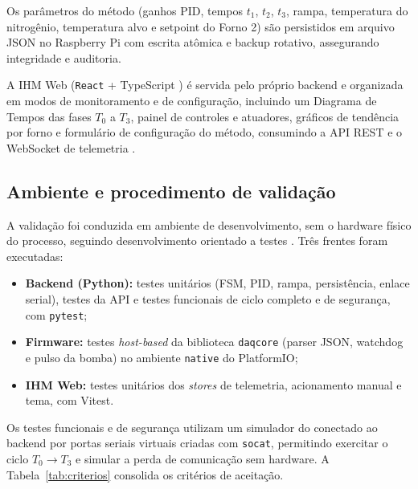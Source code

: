 Os par\^ametros do m\'etodo (ganhos PID, tempos $t_1$, $t_2$, $t_3$, rampa,
temperatura do nitrog\^enio, temperatura alvo e setpoint do Forno 2) s\~ao
persistidos em arquivo JSON no Raspberry Pi com escrita at\^omica e backup
rotativo, assegurando integridade e auditoria.

A IHM Web (\texttt{React} + TypeScript \cite{react}) \'e servida pelo pr\'oprio
backend e organizada em modos de monitoramento e de configura\c{c}\~ao,
incluindo um Diagrama de Tempos das fases $T_0$ a $T_3$, painel de controles e
atuadores, gr\'aficos de tend\^encia por forno e formul\'ario de configura\c{c}\~ao
do m\'etodo, consumindo a API REST e o WebSocket de telemetria \cite{fette2011}.

\subsection{Ambiente e procedimento de valida\c{c}\~ao}

A valida\c{c}\~ao foi conduzida em ambiente de desenvolvimento, sem o hardware
f\'isico do processo, seguindo desenvolvimento orientado a testes
\cite{beck2002}. Tr\^es frentes foram executadas:

\begin{itemize}
  \item \textbf{Backend (Python):} testes unit\'arios (FSM, PID, rampa,
  persist\^encia, enlace serial), testes da API e testes funcionais de ciclo
  completo e de seguran\c{c}a, com \texttt{pytest};
  \item \textbf{Firmware:} testes \emph{host-based} da biblioteca \texttt{daqcore}
  (parser JSON, watchdog e pulso da bomba) no ambiente \texttt{native} do
  PlatformIO;
  \item \textbf{IHM Web:} testes unit\'arios dos \emph{stores} de telemetria,
  acionamento manual e tema, com Vitest.
\end{itemize}

Os testes funcionais e de seguran\c{c}a utilizam um simulador do \daq conectado
ao backend por portas seriais virtuais criadas com \texttt{socat}, permitindo
exercitar o ciclo $T_0 \to T_3$ e simular a perda de comunica\c{c}\~ao sem
hardware. A Tabela~\ref{tab:criterios} consolida os crit\'erios de aceita\c{c}\~ao.

